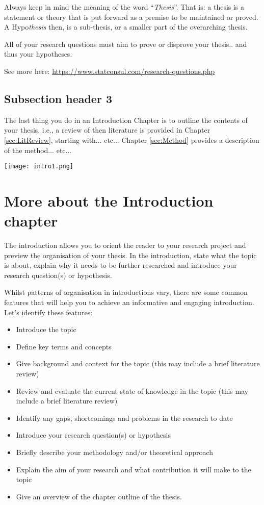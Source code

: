 Always keep in mind the meaning of the word ``\textit{Thesis}''. That is: a
thesis is a statement or theory that is put forward as a premise to be
maintained or proved. A Hypo\textit{thesis} then, is a sub-thesis, or a smaller
part of the overarching thesis.

All of your research questions must aim to prove or disprove your thesis.. and
thus your hypotheses.

See more here: \url{https://www.statconsul.com/research-questions.php}
\subsection{Subsection header 3}
The last thing you do in an Introduction Chapter is to outline the contents of
your thesis, i.e., a review of then literature is provided in Chapter
\ref{sec:LitReview}, starting with... etc... Chapter \ref{sec:Method} provides
a description of the method... etc...

\vfill
\texttt{[image: intro1.png]}
\vfill

\section{More about the Introduction chapter}
The introduction allows you to orient the reader to your research project and
preview the organisation of your thesis. In the introduction, state what the
topic is about, explain why it needs to be further researched and introduce
your research question(s) or hypothesis.

Whilst patterns of organisation in introductions vary, there are some common
features that will help you to achieve an informative and engaging
introduction. Let’s identify these features:

\begin{itemize}
	\item Introduce the topic
	\item Define key terms and concepts
	\item Give background and context for the topic (this may include a brief literature
	      review)
	\item Review and evaluate the current state of knowledge in the topic (this may
	      include a brief literature review)
	\item Identify any gaps, shortcomings and problems in the research to date
	\item Introduce your research question(s) or hypothesis
	\item Briefly describe your methodology and/or theoretical approach
	\item Explain the aim of your research and what contribution it will make to the
	      topic
	\item Give an overview of the chapter outline of the thesis.
\end{itemize}

